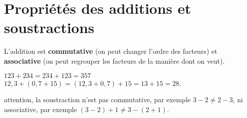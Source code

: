 \section{Propriétés des additions et soustractions} %

\begin{propriete}
   L'addition est {\bf commutative} (on peut changer l’ordre des facteurs) et {\bf associative} (on peut regrouper les facteurs de la manière dont on veut).
\end{propriete}

\begin{exemple*1}
   $123+234 =234+123 =357$ \\
      $12,3+(0,7+15) =(12,3+0,7)+15 =13+15 =28$.
\end{exemple*1}

\begin{remarque}
   attention, la soustraction n'est pas commutative, par exemple $3-2 \neq2-3$, ni associative, par exemple $(3-2)+1 \neq3-(2+1)$.
\end{remarque}
